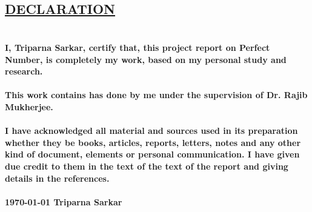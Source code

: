 \documentclass[12pt,,a4paper]{article}
\begin{document}
\clearpage


\begin{center}
    
\section*{\color{blue}\underline {DECLARATION}}
\end{center}
\thispagestyle{empty}
\section*{}

\paragraph{
I, Triparna Sarkar, certify that, this project report on \textbf{Perfect Number}, is completely my work, based on my personal study and research.
}
\paragraph{
This work contains has done by me under the supervision of Dr. Rajib Mukherjee.
} 

\paragraph{
I have acknowledged all material and sources used in its preparation whether they be books, articles, reports, letters, notes and any other kind of document, elements or personal communication. I have given due credit to them in the text of the text of the report and giving details in the references. 
} 



\paragraph{
    \today \hspace{7cm} Triparna Sarkar
}
\vspace{1.5cm}



\newpage



\end{document}
